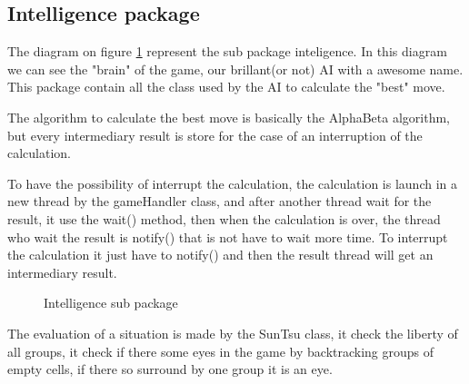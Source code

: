 \subsection{Intelligence package}

The diagram on figure \ref{intel} represent the sub package inteligence. In this diagram we can see the "brain" of the game, our brillant(or not) AI with a awesome name. This package contain all the class used by the AI to calculate the "best" move. 

The algorithm to calculate the best move is basically the AlphaBeta algorithm, but every intermediary result is store for the case of an interruption of the calculation. 

To have the possibility of interrupt the calculation, the calculation is launch in a new thread by the gameHandler class, and after another thread wait for the result, it use the wait() method, then when the calculation is over, the thread who wait the result is notify() that is not have to wait more time. To interrupt the calculation it just have to notify() and then the result thread will get an intermediary result.


  \begin{figure}[h!]
  \centering
  \caption{Intelligence sub package}
\label{intel} 
 \end{figure}

The evaluation of a situation is made by the SunTsu class, it check the liberty of all groups, it check if there some eyes in the game by backtracking groups of empty cells, if there so surround by one group it is an eye.


\clearpage
